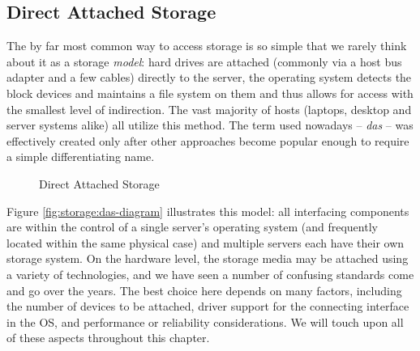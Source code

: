 \subsection{Direct Attached Storage}
\label{file systems:storage-models:das}

The by far most common way to access storage is so
simple that we rarely think about it as a storage {\em
model}:  hard drives are attached (commonly via a host
bus adapter and a few cables)
directly to the server, the operating system detects
the block devices and maintains a file system on them
and thus allows for access with the smallest level of
indirection.  The vast majority of hosts (laptops,
desktop and server systems alike) all utilize this
method.  The term used nowadays -- {\em \gls{das}
} -- was effectively
created only after other approaches become popular
enough to require a simple differentiating name.

\begin{figure}[ht]
	\centering
	\hspace{5em}
	\caption{Direct Attached Storage}
\end{figure}


Figure \ref{fig:storage:das-diagram} illustrates this
model: all interfacing components are within the
control of a single server's operating system (and
frequently located within the same physical case) and
multiple servers each have their own storage system.
On the hardware level, the storage media may be
attached using a variety of technologies, and we have
seen a number of confusing standards come and go over
the years.  The best choice here depends on many
factors, including the number of devices to be
attached, driver support for the connecting interface
in the OS, and performance or reliability
considerations.  We will touch upon all of these
aspects throughout this chapter.

